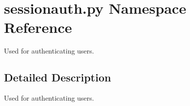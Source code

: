 \hypertarget{namespacesessionauth_1_1py}{}\section{sessionauth.\+py Namespace Reference}
\label{namespacesessionauth_1_1py}


Used for authenticating users.  




\subsection{Detailed Description}
Used for authenticating users. 